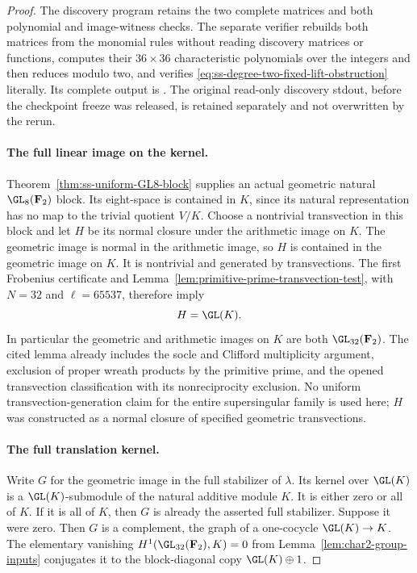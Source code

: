 \begin{proof}
The discovery program
retains the two complete matrices and both polynomial and image-witness
checks. The separate verifier
rebuilds both matrices from the monomial rules without reading discovery
matrices or functions, computes their $36\times36$ characteristic
polynomials over the integers and then reduces modulo two, and verifies
\eqref{eq:ss-degree-two-fixed-lift-obstruction} literally. Its complete
output is
.
The original read-only discovery stdout, before the checkpoint freeze
was released, is retained separately and not overwritten by the rerun.

\paragraph{The full linear image on the kernel.}
Theorem~\ref{thm:ss-uniform-GL8-block} supplies an actual geometric natural
$\GL_8(\mathbf F_2)$ block. Its eight-space is contained in $K$, since
its natural representation has no map to the trivial quotient $V/K$.
Choose a nontrivial transvection in this block and let $H$ be its normal
closure under the arithmetic image on $K$.
The geometric image is normal in the arithmetic image, so $H$ is
contained in the geometric image on $K$. It is nontrivial and generated
by transvections. The first Frobenius certificate and
Lemma~\ref{lem:primitive-prime-transvection-test}, with $N=32$ and
$\ell=65537$, therefore imply
\[
                       H=\GL(K).
\]
In particular the geometric and arithmetic images on $K$ are both
$\GL_{32}(\mathbf F_2)$. The cited lemma already includes the socle and
Clifford multiplicity argument, exclusion of proper wreath products by
the primitive prime, and the opened transvection classification with
its nonreciprocity exclusion. No uniform transvection-generation claim
for the entire supersingular family is used here; $H$ was constructed
as a normal closure of specified geometric transvections.

\paragraph{The full translation kernel.}
Write $G$ for the geometric image in the full stabilizer of $\lambda$.
Its kernel over $\GL(K)$ is a $\GL(K)$-submodule of the natural additive
module $K$. It is either zero or all of $K$.
If it is all of $K$, then $G$ is already the asserted full stabilizer.
Suppose it were zero. Then $G$ is a complement, the graph of a
one-cocycle $\GL(K)\to K$. The elementary vanishing
$H^1(\GL_{32}(\mathbf F_2),K)=0$ from
Lemma~\ref{lem:char2-group-inputs} conjugates it to the block-diagonal
copy $\GL(K)\oplus1$.


\end{proof}
